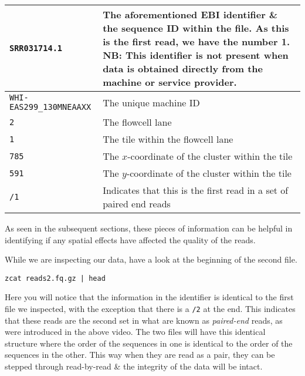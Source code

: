 \begin{tabular}{|p{5cm} | p{9cm} |}
  \hline
  \texttt{SRR031714.1} & The aforementioned EBI identifier \& the sequence ID within the file. As this is the first read, we have the number 1. NB: This identifier is \textbf{not} present when data is obtained directly from the machine or service provider.\\
  \hline
  \texttt{WHI-EAS299_130MNEAAXX} & The unique machine ID \\
  \hline
  \texttt{2} & The flowcell lane \\
  \hline
  \texttt{1} & The tile within the flowcell lane \\
  \hline
  \texttt{785} & The $x$-coordinate of the cluster within the tile \\
  \hline
  \texttt{591} & The $y$-coordinate of the cluster within the tile \\
  \hline
  \texttt{/1} & Indicates that this is the first read in a set of paired end reads \\
  \hline
\end{tabular}

As seen in the subsequent sections, these pieces of information can be helpful in identifying if any spatial effects have affected the quality of the reads.\\

\begin{steps}
While we are inspecting our data, have a look at the beginning of the second file.
\begin{lstlisting}
zcat reads2.fq.gz | head
\end{lstlisting}
Here you will notice that the information in the identifier is identical to the first file we inspected, with the exception that there is a \texttt{/2} at the end.
This indicates that these reads are the second set in what are known as \textit{paired-end} reads, as were introduced in the above video.
The two files will have this identical structure where the order of the sequences in one is identical to the order of the sequences in the other.
This way when they are read as a pair, they can be stepped through read-by-read \& the integrity of the data will be intact.
\end{steps}

